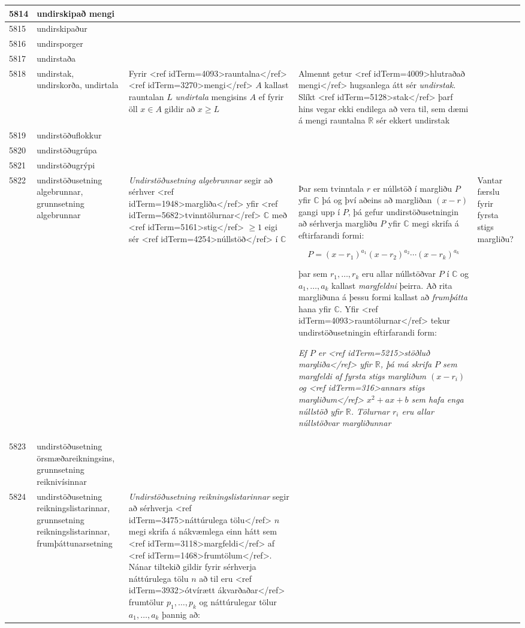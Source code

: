 \begin{longtable}{p{}|p{}|p{}|p{}|p{}}
\hline
5814 & undirskipað mengi &  &  &  \\
\hline
5815 & undirskipaður &  &  &  \\
\hline
5816 & undirsporger &  &  &  \\
\hline
5817 & undirstaða &  &  &  \\
\hline
5818 & undirstak, undirskorða, undirtala & Fyrir <ref idTerm=4093>rauntalna</ref><ref idTerm=3270>mengi</ref> $A$ kallast rauntalan $L$ \textit{undirtala} mengisins $A$ ef fyrir öll $x \in A$ gildir að $x \geq L$ & Almennt getur <ref idTerm=4009>hlutraðað mengi</ref> hugsanlega átt sér \textit{undirstak}. Slíkt <ref idTerm=5128>stak</ref> þarf hins vegar ekki endilega að vera til, sem dæmi á mengi rauntalna $\mathbb{R}$ sér ekkert undirstak &  \\
\hline
5819 & undirstöðuflokkur &  &  &  \\
\hline
5820 & undirstöðugrúpa &  &  &  \\
\hline
5821 & undirstöðugrýpi &  &  &  \\
\hline
5822 & undirstöðusetning algebrunnar, grunnsetning algebrunnar & \textit{Undirstöðusetning algebrunnar} segir að sérhver <ref idTerm=1948>margliða</ref> yfir <ref idTerm=5682>tvinntölurnar</ref> $\mathbb{C}$ með <ref idTerm=5161>stig</ref> $\geq 1$ eigi sér <ref idTerm=4254>núllstöð</ref> í $\mathbb{C}$ & Þar sem tvinntala $r$ er núllstöð í margliðu $P$ yfir $\mathbb{C}$ þá og því aðeins að margliðan $(x - r)$ gangi upp í $P$, þá gefur undirstöðusetningin að sérhverja margliðu $P$ yfir $\mathbb{C}$ megi skrifa á eftirfarandi formi:

\[P = (x - r_{1})^{a_{1}} (x - r_{2})^{a_{2}} \cdots (x - r_{k})^{a_{k}}\]

þar sem $r_{1},\ldots,r_{k}$ eru allar núllstöðvar $P$ í $\mathbb{C}$ og $a_{1},\ldots,a_{k}$ kallast \textit{margfeldni} þeirra. Að rita margliðuna á þessu formi kallast að \textit{frumþátta} hana yfir $\mathbb{C}$. Yfir <ref idTerm=4093>rauntölurnar</ref> tekur undirstöðusetningin eftirfarandi form:

\textit{Ef $P$ er <ref idTerm=5215>stöðluð margliða</ref> yfir $\mathbb{R}$, þá má skrifa $P$ sem margfeldi af fyrsta stigs margliðum $(x-r_i)$ og <ref idTerm=316>annars stigs margliðum</ref> $x^2+ax+b$ sem hafa enga núllstöð yfir $\mathbb{R}$. Tölurnar $r_i$ eru allar núllstöðvar margliðunnar} & Vantar færslu fyrir fyrsta stigs margliðu? \\
\hline
5823 & undirstöðusetning örsmæðareikningsins, grunnsetning reiknivísinnar &  &  &  \\
\hline
5824 & undirstöðusetning reikningslistarinnar, grunnsetning reikningslistarinnar, frumþáttunarsetning & \textit{Undirstöðusetning reikningslistarinnar} segir að sérhverja <ref idTerm=3475>náttúrulega tölu</ref> $n$ megi skrifa á nákvæmlega einn hátt sem <ref idTerm=3118>margfeldi</ref> af <ref idTerm=1468>frumtölum</ref>. Nánar tiltekið gildir fyrir sérhverja náttúrulega tölu $n$ að til eru <ref idTerm=3932>ótvírætt ákvarðaðar</ref> frumtölur $p_{1}, \ldots ,p_{k}$ og náttúrulegar tölur $a_{1}, \ldots ,a_{k}$ þannig að:


\end{longtable}
